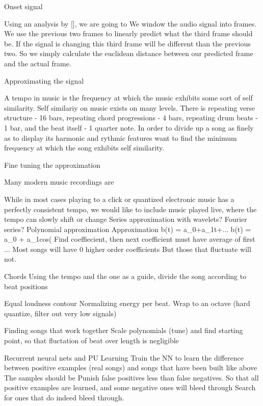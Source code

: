 Onset signal

Using an analysis by [], we are going to 
We window the audio signal into frames.
We use the previous two frames to linearly predict what the third frame should be.
If the signal is changing this third frame will be different than the previous two.
So we simply calculate the euclidean distance between our predicted frame and the actual frame.

Approximating the signal

A tempo in music is the frequency at which the music exhibits some sort of self similarity. Self similariy on music exists on many levels. There is repeating verse structure - 16 bars, repeating chord progressions - 4 bars, repeating drum beats - 1 bar, and the beat itself - 1 quarter note.
In order to divide up a song as finely as to display its harmonic and rythmic features want to find the minimum frequency at which the song exhibits self similarity. 

Fine tuning the approximation

Many modern music recordings are 

While in most cases playing to a click or quantized electronic music has a perfectly consistent tempo, we would like to include music played live, where the tempo can slowly shift or change
Series approximation with wavelets?
Fourier series?
Polynomial approximation
Approximation
b(t) = a_0+a_1t+...
b(t) = a_0 + a_1cos(
Find coeffiecient, then next coefficient must have average of first ...
Most songs will have 0 higher order coefficients
But those that fluctuate will not.

Chords
Using the tempo and the one as a guide,
divide the song according to beat positions

Equal loudness contour
Normalizing energy per beat.
Wrap to an octave (hard quantize, filter out very low signals)

Finding songs that work together
Scale polynomials (tune) and find starting point,
so that fluctation of beat over length is negligible

Recurrent neural nets and PU Learning
Train the NN to learn the difference between positive examples
(real songs)
and songs that have been built like above
The samples should be
Punish false positives less than false negatives.
So that all positive examples are learned, and some negative ones will bleed through
Search for ones that do indeed bleed through.

